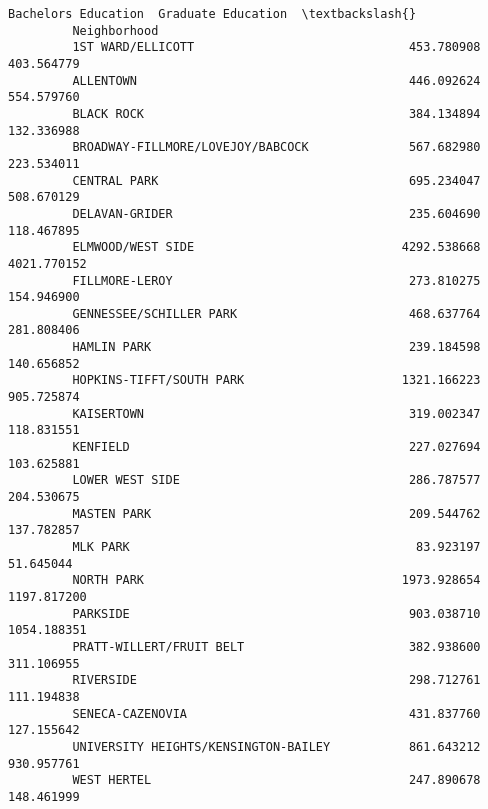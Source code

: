 \documentclass[11pt]{article}
\begin{document}
\begin{Verbatim}[commandchars=\\\{\}]
                                               Bachelors Education  Graduate Education  \textbackslash{}
         Neighborhood                                                                    
         1ST WARD/ELLICOTT                              453.780908          403.564779   
         ALLENTOWN                                      446.092624          554.579760   
         BLACK ROCK                                     384.134894          132.336988   
         BROADWAY-FILLMORE/LOVEJOY/BABCOCK              567.682980          223.534011   
         CENTRAL PARK                                   695.234047          508.670129   
         DELAVAN-GRIDER                                 235.604690          118.467895   
         ELMWOOD/WEST SIDE                             4292.538668         4021.770152   
         FILLMORE-LEROY                                 273.810275          154.946900   
         GENNESSEE/SCHILLER PARK                        468.637764          281.808406   
         HAMLIN PARK                                    239.184598          140.656852   
         HOPKINS-TIFFT/SOUTH PARK                      1321.166223          905.725874   
         KAISERTOWN                                     319.002347          118.831551   
         KENFIELD                                       227.027694          103.625881   
         LOWER WEST SIDE                                286.787577          204.530675   
         MASTEN PARK                                    209.544762          137.782857   
         MLK PARK                                        83.923197           51.645044   
         NORTH PARK                                    1973.928654         1197.817200   
         PARKSIDE                                       903.038710         1054.188351   
         PRATT-WILLERT/FRUIT BELT                       382.938600          311.106955   
         RIVERSIDE                                      298.712761          111.194838   
         SENECA-CAZENOVIA                               431.837760          127.155642   
         UNIVERSITY HEIGHTS/KENSINGTON-BAILEY           861.643212          930.957761   
         WEST HERTEL                                    247.890678          148.461999   
         

\end{Verbatim}
\end{document}

